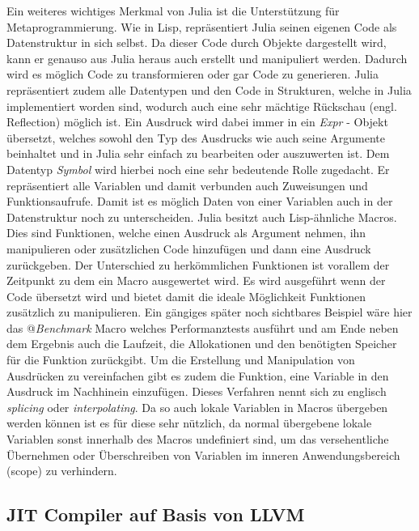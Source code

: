 \documentclass[proseminar,german,utf8]{zihpub}
\begin{document}
Ein weiteres wichtiges Merkmal von Julia ist die Unterstützung für Metaprogrammierung. Wie in Lisp, repräsentiert Julia seinen eigenen Code als Datenstruktur in sich selbst. Da dieser Code durch Objekte dargestellt wird, kann er genauso aus Julia heraus auch erstellt und manipuliert werden. Dadurch wird es möglich Code zu transformieren oder gar Code zu generieren. Julia repräsentiert zudem alle Datentypen und den Code in Strukturen, welche in Julia implementiert worden sind, wodurch auch eine sehr mächtige Rückschau (engl. Reflection) möglich ist. Ein Ausdruck wird dabei immer in ein \textit{Expr} - Objekt übersetzt, welches sowohl den Typ des Ausdrucks wie auch seine Argumente beinhaltet und in Julia sehr einfach zu bearbeiten oder auszuwerten ist. Dem Datentyp \textit{Symbol} wird hierbei noch eine sehr bedeutende Rolle zugedacht. Er repräsentiert alle Variablen und damit verbunden auch Zuweisungen und Funktionsaufrufe. Damit ist es möglich Daten von einer Variablen auch in der Datenstruktur noch zu unterscheiden. Julia besitzt auch Lisp-ähnliche Macros. Dies sind Funktionen, welche einen Ausdruck als Argument nehmen, ihn manipulieren oder zusätzlichen Code hinzufügen und dann eine Ausdruck zurückgeben. Der Unterschied zu herkömmlichen Funktionen ist vorallem der Zeitpunkt zu dem ein Macro ausgewertet wird. Es wird ausgeführt wenn der Code übersetzt wird und bietet damit die ideale Möglichkeit Funktionen zusätzlich zu manipulieren. Ein gängiges später noch sichtbares Beispiel wäre hier das @\textit{Benchmark} Macro welches Performanztests ausführt und am Ende neben dem Ergebnis auch die Laufzeit, die Allokationen und den benötigten Speicher für die Funktion zurückgibt. Um die Erstellung und Manipulation von Ausdrücken zu vereinfachen gibt es zudem die Funktion, eine Variable in den Ausdruck im Nachhinein einzufügen. Dieses Verfahren nennt sich zu englisch \textit{splicing} oder \textit{interpolating}. Da so auch lokale Variablen in Macros übergeben werden können ist es für diese sehr nützlich, da normal übergebene lokale Variablen sonst innerhalb des Macros undefiniert sind, um das versehentliche Übernehmen oder Überschreiben von Variablen im inneren Anwendungsbereich (scope) zu verhindern.~\cite{JuliaLangDocumentation}~\cite{SyntaxTreeWiki}~\cite{StringInteringWiki}

\subsection{JIT Compiler auf Basis von LLVM}
\end{document}
